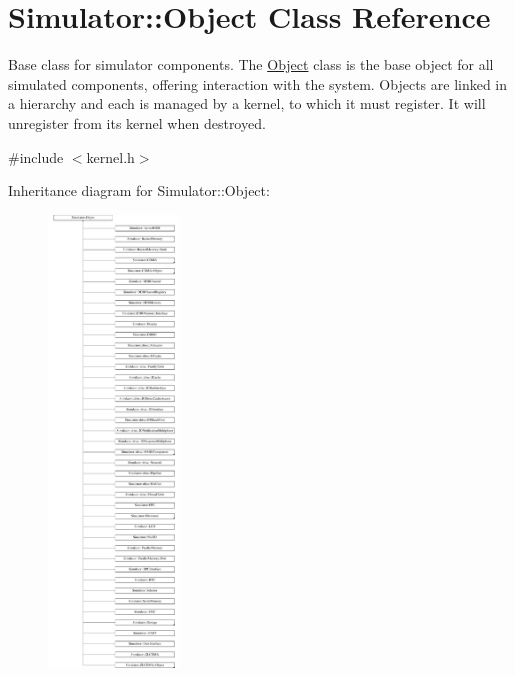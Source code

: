 \hypertarget{class_simulator_1_1_object}{\section{Simulator\+:\+:Object Class Reference}
\label{class_simulator_1_1_object}
}


Base class for simulator components. The \hyperlink{class_simulator_1_1_object}{Object} class is the base object for all simulated components, offering interaction with the system. Objects are linked in a hierarchy and each is managed by a kernel, to which it must register. It will unregister from its kernel when destroyed.  




{\ttfamily \#include $<$kernel.\+h$>$}

Inheritance diagram for Simulator\+:\+:Object\+:\begin{figure}[H]
\begin{center}
\leavevmode
\includegraphics[height=12.000000cm]{class_simulator_1_1_object}
\end{center}
\end{figure}
